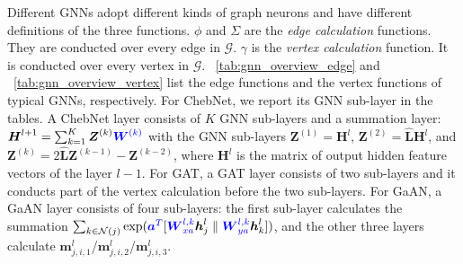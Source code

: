 Different GNNs adopt different kinds of graph neurons and have different definitions of the three functions.
$\phi$ and $\Sigma$ are the \emph{edge calculation} functions.
They are conducted over every edge in $\mathcal{G}$.
$\gamma$ is the \emph{vertex calculation} function.
It is conducted over every vertex in $\mathcal{G}$.
\tablename~\ref{tab:gnn_overview_edge} and \tablename~\ref{tab:gnn_overview_vertex} list the edge functions and the vertex functions of typical GNNs, respectively.
For ChebNet, we report its GNN sub-layer in the tables. 
A ChebNet layer consists of $K$ GNN sub-layers and a summation layer:
$\boldsymbol{H}^{l+1} = \sum_{k=1}^K{\boldsymbol{Z}^{(k)} \textcolor{blue}{\boldsymbol{W}^{(k)}}}$ with the GNN sub-layers $\boldsymbol{Z}^{(1)}=\boldsymbol{H}^l$, $\boldsymbol{Z}^{(2)}=\hat{\boldsymbol{L}}\boldsymbol{H}^l$, and $\boldsymbol{Z}^{(k)}=2\hat{\boldsymbol{L}}\boldsymbol{Z}^{(k-1)} - \boldsymbol{Z}^{(k-2)}$, where $\boldsymbol{H}^l$ is the matrix of output hidden feature vectors of the layer $l-1$.
For GAT, a GAT layer consists of two sub-layers and it conducts part of the vertex calculation before the two sub-layers.
For GaAN, a GaAN layer consists of four sub-layers: the first sub-layer calculates the summation $\sum_{k \in \mathcal{N}(j)}\exp(\textcolor{blue}{\boldsymbol{a}^T} [ \textcolor{blue}{\boldsymbol{W}^{l,k}_{xa}} \boldsymbol{h}_j^l \parallel \textcolor{blue}{\boldsymbol{W}^{l,k}_{ya}}  \boldsymbol{h}_k^l] )$, and the other three layers calculate $\boldsymbol{m}^l_{j,i,1}$/$\boldsymbol{m}^l_{j,i,2}$/$\boldsymbol{m}^l_{j,i,3}$.

